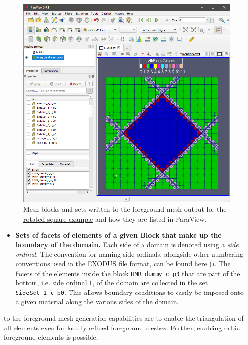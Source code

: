 \begin{figure}[h]
    \begin{center}
    \includegraphics[width=12cm]{Figures/paraview_mesh_sets.png}
    \caption{Mesh blocks and sets written to the foreground mesh output for the \href{https://github.com/kkmaute/moris/blob/main/share/doc/mesh_generation/examples/Rotated_Square_Example.xml}{rotated square example} and how they are listed in ParaView.} 
    \label{fig:meshsets_paraview}
    \end{center}
\end{figure}

\begin{itemize}
    \item \textbf{Sets of facets of elements of a given Block that make up the boundary of the domain.} Each side of a domain is denoted using a \emph{side ordinal}. The convention for naming side ordinals, alongside other numbering conventions used in the EXODUS file format, can be found \href{https://sandialabs.github.io/seacas-docs/html/md_include_exodus_element_types.html}{here (\ExternalLink)}.
    The facets of the elements inside the block \texttt{HMR\_dummy\_c\_p0} that are part of the bottom, i.e. side ordinal $1$, of the domain are collected in the set \texttt{SideSet\_1\_c\_p0}. This allows boundary conditions to easily be imposed onto a given material along the various sides of the domain.
\end{itemize}

 to the foreground mesh generation capabilities are to enable the triangulation of all elements even for locally refined foreground meshes. Further, enabling cubic foreground elements is possible.


